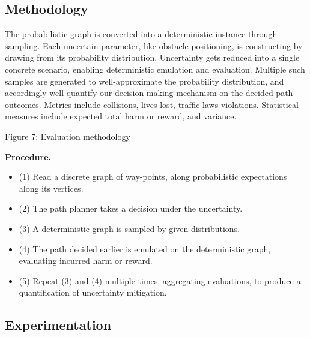 \subsection{Methodology} \label{Methodology}

The probabilistic graph is converted into a deterministic instance through sampling. Each uncertain parameter, like obstacle positioning, is constructing by drawing from its probability distribution. Uncertainty gets reduced into a single concrete scenario, enabling deterministic emulation and evaluation. Multiple such samples are generated to well-approximate the probability distribution, and accordingly well-quantify our decision making mechanism on the decided path outcomes. Metrics include collisions, lives lost, traffic laws violations. Statistical measures include expected total harm or reward, and variance.


\begin{center}
    Figure 7: Evaluation methodology
\end{center}

\textbf{Procedure.}
\begin{itemize}
    \item (1) Read a discrete graph of way-points, along probabilistic expectations along its vertices.
    \item (2) The path planner takes a decision under the uncertainty.
    \item (3) A deterministic graph is sampled by given distributions.
     \item (4) The path decided earlier is emulated on the deterministic graph, evaluating incurred harm or reward.
    \item (5) Repeat (3) and (4) multiple times, aggregating evaluations, to produce a quantification of uncertainty mitigation.
\end{itemize}

\subsection{Experimentation} \label{Experimentation}

